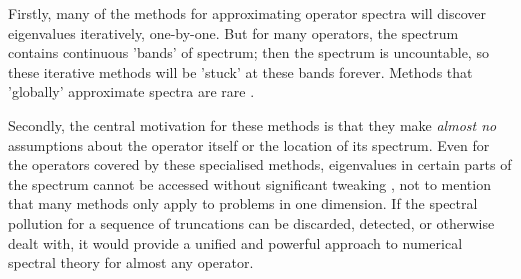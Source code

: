 \documentclass[../main.tex]{subfiles}
\begin{document}
Firstly, many of the methods for approximating operator spectra will discover eigenvalues
iteratively, one-by-one. But for many operators, the spectrum contains continuous 'bands' of spectrum;
then the spectrum is uncountable, so these iterative methods will be 'stuck' at these
bands forever. Methods that 'globally' approximate spectra are rare 
\cite{pryce1993numerical}.

Secondly, the central motivation for these methods is that they make \emph{almost no}
assumptions about the operator itself or the location of its spectrum. Even for
the operators covered by these specialised methods, eigenvalues in certain parts
of the spectrum cannot be accessed without significant tweaking
\cite{aceto2006numerical}, not to mention that many methods only apply to
problems in one dimension. If the spectral pollution for a sequence of
truncations can be discarded, detected, or otherwise dealt with, it would provide
a unified and powerful approach to numerical spectral theory for almost any operator.
\end{document}
